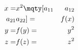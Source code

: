 \begin{equation}
    \begin{aligned}
        x =& x^2 \mqty[a_{11}  & a_{12} \\ a_{21} & a_{22}] =& f(x) \\
        y =& f(y) =& y^2 \\
        z =& f(z) =& z^2
    \end{aligned}
\end{equation}
